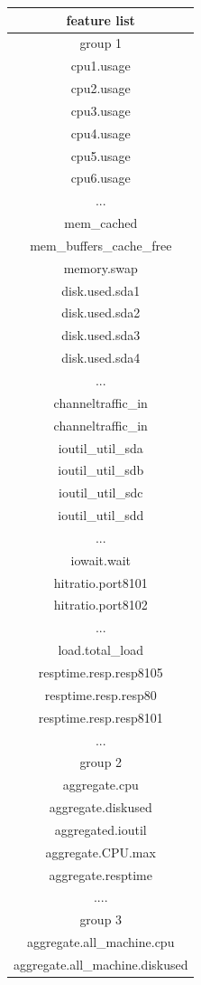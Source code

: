 \documentclass[5p]{elsarticle}
\begin{document}
\begin{table}[]
\centering
\begin{tabular}{|c|}
\hline  
feature list\\
\hline  
group 1\\
\hline  
cpu1.usage\\
cpu2.usage\\
cpu3.usage\\
cpu4.usage\\
cpu5.usage\\
cpu6.usage\\
...  \\
mem\_cached\\
mem\_buffers\_cache\_free\\
memory.swap\\ 
disk.used.sda1\\
disk.used.sda2\\
disk.used.sda3\\
disk.used.sda4\\
...\\
channeltraffic\_in\\
channeltraffic\_in\\
ioutil\_util\_sda\\
ioutil\_util\_sdb\\
ioutil\_util\_sdc\\
ioutil\_util\_sdd\\
...\\
iowait.wait\\
hitratio.port8101\\
hitratio.port8102\\
...\\
load.total_load\\
resptime.resp.resp8105\\
resptime.resp.resp80\\
resptime.resp.resp8101\\
...\\
\hline  
group 2\\
\hline 
aggregate.cpu\\
aggregate.diskused\\
aggregated.ioutil\\
aggregate.CPU.max\\
aggregate.resptime\\
....\\
\hline  
group 3\\
\hline 
aggregate.all\_machine.cpu\\
aggregate.all\_machine.diskused\\

\end{tabular}
\end{table}
\end{document}
